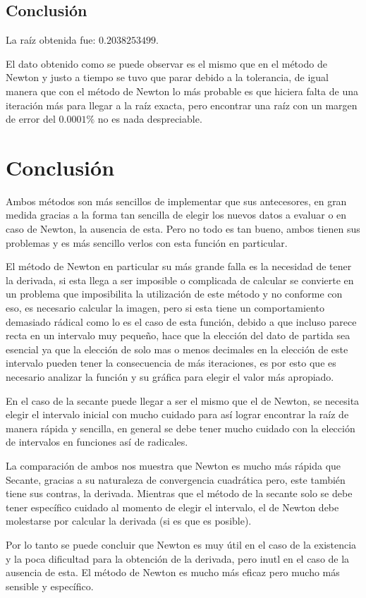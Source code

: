 \documentclass{article}
\begin{document}
\subsection*{Conclusión}
La raíz obtenida fue: $0.2038253499$.


El dato obtenido como se puede observar es el mismo que en el método de Newton y justo a tiempo se tuvo que parar debido a
la tolerancia, de igual manera que con el método de Newton lo más probable es que hiciera falta de una iteración más para llegar
a la raíz exacta, pero encontrar una raíz con un margen de error del $0.0001\%$ no es nada despreciable.


\section{Conclusión}
Ambos métodos son más sencillos de implementar que sus antecesores, en gran medida gracias a la forma tan sencilla de elegir
los nuevos datos a evaluar o en caso de Newton, la ausencia de esta.
Pero no todo es tan bueno, ambos tienen sus problemas y es más sencillo verlos con esta función en particular.


El método de Newton en particular su más grande falla es la necesidad de tener la derivada, si esta llega a ser imposible o
complicada de calcular se convierte en un problema que imposibilita la utilización de este método y no conforme con eso, es
necesario calcular la imagen, pero si esta tiene un comportamiento demasiado rádical como lo es el caso de esta función,
debido a que incluso parece recta en un intervalo muy pequeño, hace que la elección del dato de partida sea esencial ya que
la elección de solo mas o menos decimales en la elección de este intervalo pueden tener la consecuencia de más iteraciones,
es por esto que es necesario analizar la función y su gráfica para elegir el valor más apropiado.


En el caso de la secante puede llegar a ser el mismo que el de Newton, se necesita elegir el intervalo inicial con mucho
cuidado para así lograr encontrar la raíz de manera rápida y sencilla, en general se debe tener mucho cuidado con la elección
de intervalos en funciones así de radicales.


La comparación de ambos nos muestra que Newton es mucho más rápida que Secante, gracias a su naturaleza de convergencia cuadrática
pero, este también tiene sus contras, la derivada. Mientras que el método de la secante solo se debe tener específico cuidado al
momento de elegir el intervalo, el de Newton debe molestarse por calcular la derivada (si es que es posible).


Por lo tanto se puede concluir que Newton es muy útil en el caso de la existencia y la poca dificultad para la obtención de la derivada,
pero inutl en el caso de la ausencia de esta. El método de Newton es mucho más eficaz pero mucho más sensible y específico.
\end{document}

